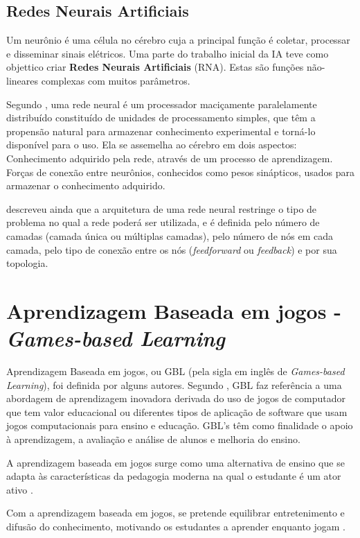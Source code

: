 \documentclass[
	12pt,				%
	openright,			%
	oneside,
	a4paper,			%
	english,			%
	french,				%
	spanish,			%
	brazil,				%
	]{abntex2}
\begin{document}
\subsection{Redes Neurais Artificiais}
\label{sec:RNA}
Um neurônio é uma célula no cérebro cuja a principal função é coletar, processar e disseminar sinais elétricos. Uma parte do trabalho inicial da IA teve como objettico criar \textbf{Redes Neurais Artificiais} (RNA). Estas são funções não-lineares complexas com muitos parâmetros. \cite{russell2004inteligencia}

Segundo , uma rede neural é um processador maciçamente paralelamente distribuído constituído de unidades de processamento simples, que têm a propensão natural para armazenar conhecimento experimental e torná-lo disponível para o uso. Ela se assemelha ao cérebro em dois aspectos: Conhecimento adquirido pela rede, através de um processo de aprendizagem. Forças de conexão entre neurônios, conhecidos como pesos sinápticos, usados para armazenar o conhecimento adquirido.

 descreveu ainda que a arquitetura de uma rede neural restringe o tipo de problema no qual a rede poderá ser utilizada, e é definida pelo número de camadas (camada única ou múltiplas camadas), pelo número de nós em cada camada, pelo tipo de conexão entre os nós (\textit{feedforward} ou \textit{feedback}) e por sua topologia.

\section{Aprendizagem Baseada em jogos - \textit{Games-based Learning}}
\label{sec:GBL}

Aprendizagem Baseada em jogos, ou GBL (pela sigla em inglês de \textit{Games-based Learning}), foi definida por alguns autores. Segundo , GBL faz referência a uma abordagem de aprendizagem inovadora derivada do uso de jogos de computador que tem valor educacional ou diferentes tipos de aplicação de software que usam jogos computacionais para ensino e educação. GBL's têm como finalidade o apoio à aprendizagem, a avaliação e análise de alunos e melhoria do ensino.

A aprendizagem baseada em jogos surge como uma alternativa de ensino que se adapta às características da pedagogia moderna na qual o estudante é um ator ativo \cite{monsalve2014aprendizagem}.

Com a aprendizagem baseada em jogos, se pretende equilibrar
entretenimento e difusão do conhecimento, motivando os estudantes a aprender
enquanto jogam \cite{monsalve2011teaching}.
\end{document}
